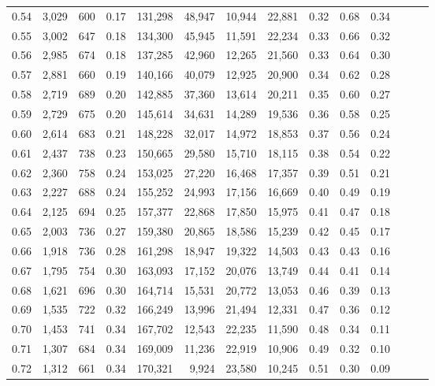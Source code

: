 \begin{tabular}{rrrrrrrrrrrrrr}
0.54 &  3,029 &  600 &  0.17 &  131,298 &   48,947 &  10,944 &  22,881 &  0.32 &  0.68 &      0.34 \\
0.55 &  3,002 &  647 &  0.18 &  134,300 &   45,945 &  11,591 &  22,234 &  0.33 &  0.66 &      0.32 \\
0.56 &  2,985 &  674 &  0.18 &  137,285 &   42,960 &  12,265 &  21,560 &  0.33 &  0.64 &      0.30 \\
0.57 &  2,881 &  660 &  0.19 &  140,166 &   40,079 &  12,925 &  20,900 &  0.34 &  0.62 &      0.28 \\
0.58 &  2,719 &  689 &  0.20 &  142,885 &   37,360 &  13,614 &  20,211 &  0.35 &  0.60 &      0.27 \\
0.59 &  2,729 &  675 &  0.20 &  145,614 &   34,631 &  14,289 &  19,536 &  0.36 &  0.58 &      0.25 \\
0.60 &  2,614 &  683 &  0.21 &  148,228 &   32,017 &  14,972 &  18,853 &  0.37 &  0.56 &      0.24 \\
0.61 &  2,437 &  738 &  0.23 &  150,665 &   29,580 &  15,710 &  18,115 &  0.38 &  0.54 &      0.22 \\
0.62 &  2,360 &  758 &  0.24 &  153,025 &   27,220 &  16,468 &  17,357 &  0.39 &  0.51 &      0.21 \\
0.63 &  2,227 &  688 &  0.24 &  155,252 &   24,993 &  17,156 &  16,669 &  0.40 &  0.49 &      0.19 \\
0.64 &  2,125 &  694 &  0.25 &  157,377 &   22,868 &  17,850 &  15,975 &  0.41 &  0.47 &      0.18 \\
0.65 &  2,003 &  736 &  0.27 &  159,380 &   20,865 &  18,586 &  15,239 &  0.42 &  0.45 &      0.17 \\
0.66 &  1,918 &  736 &  0.28 &  161,298 &   18,947 &  19,322 &  14,503 &  0.43 &  0.43 &      0.16 \\
0.67 &  1,795 &  754 &  0.30 &  163,093 &   17,152 &  20,076 &  13,749 &  0.44 &  0.41 &      0.14 \\
0.68 &  1,621 &  696 &  0.30 &  164,714 &   15,531 &  20,772 &  13,053 &  0.46 &  0.39 &      0.13 \\
0.69 &  1,535 &  722 &  0.32 &  166,249 &   13,996 &  21,494 &  12,331 &  0.47 &  0.36 &      0.12 \\
0.70 &  1,453 &  741 &  0.34 &  167,702 &   12,543 &  22,235 &  11,590 &  0.48 &  0.34 &      0.11 \\
0.71 &  1,307 &  684 &  0.34 &  169,009 &   11,236 &  22,919 &  10,906 &  0.49 &  0.32 &      0.10 \\
0.72 &  1,312 &  661 &  0.34 &  170,321 &    9,924 &  23,580 &  10,245 &  0.51 &  0.30 &      0.09 \\

\end{tabular}
